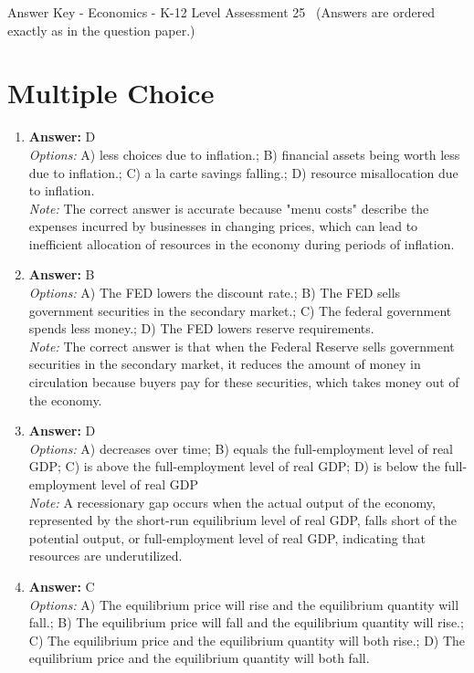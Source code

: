 \documentclass[12pt]{article}
\begin{document}
\begin{center}
Answer Key - Economics - K-12 Level Assessment 25 \
\small (Answers are ordered exactly as in the question paper.)
\end{center}

\section*{Multiple Choice}
\begin{enumerate}[label=\arabic*.]
\item \textbf{Answer:} D
\\ \textit{Options:} A) less choices due to inflation.; B) financial assets being worth less due to inflation.; C) a la carte savings falling.; D) resource misallocation due to inflation.
\\ \textit{Note:} The correct answer is accurate because "menu costs" describe the expenses incurred by businesses in changing prices, which can lead to inefficient allocation of resources in the economy during periods of inflation.
\item \textbf{Answer:} B
\\ \textit{Options:} A) The FED lowers the discount rate.; B) The FED sells government securities in the secondary market.; C) The federal government spends less money.; D) The FED lowers reserve requirements.
\\ \textit{Note:} The correct answer is that when the Federal Reserve sells government securities in the secondary market, it reduces the amount of money in circulation because buyers pay for these securities, which takes money out of the economy.
\item \textbf{Answer:} D
\\ \textit{Options:} A) decreases over time; B) equals the full-employment level of real GDP; C) is above the full-employment level of real GDP; D) is below the full-employment level of real GDP
\\ \textit{Note:} A recessionary gap occurs when the actual output of the economy, represented by the short-run equilibrium level of real GDP, falls short of the potential output, or full-employment level of real GDP, indicating that resources are underutilized.
\item \textbf{Answer:} C
\\ \textit{Options:} A) The equilibrium price will rise and the equilibrium quantity will fall.; B) The equilibrium price will fall and the equilibrium quantity will rise.; C) The equilibrium price and the equilibrium quantity will both rise.; D) The equilibrium price and the equilibrium quantity will both fall.

\end{enumerate}
\end{document}
